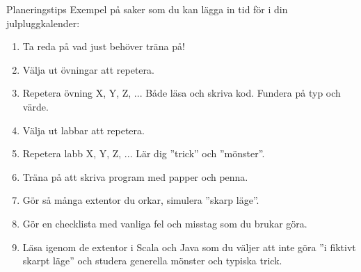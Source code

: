 \begin{Slide}{Planeringstips}\SlideFontTiny
Exempel på saker som du kan lägga in tid för i din julpluggkalender:
\begin{enumerate}
\item Ta reda på vad just  behöver träna på!
\item Välja ut övningar att repetera.
\item Repetera övning X, Y, Z, ... Både läsa och skriva kod. Fundera på typ och värde.
\item Välja ut labbar att repetera.
\item Repetera labb X, Y, Z, ... Lär dig ''trick'' och ''mönster''.
\item Träna på att skriva program med papper och penna.
\item Gör så många extentor du orkar, simulera ''skarp läge''.
\item Gör en checklista med vanliga fel och misstag som du brukar göra.

\item Läsa igenom de extentor i Scala och Java som du väljer att inte göra ''i fiktivt skarpt läge'' och studera generella mönster och typiska trick.
\end{enumerate}
\end{Slide}

